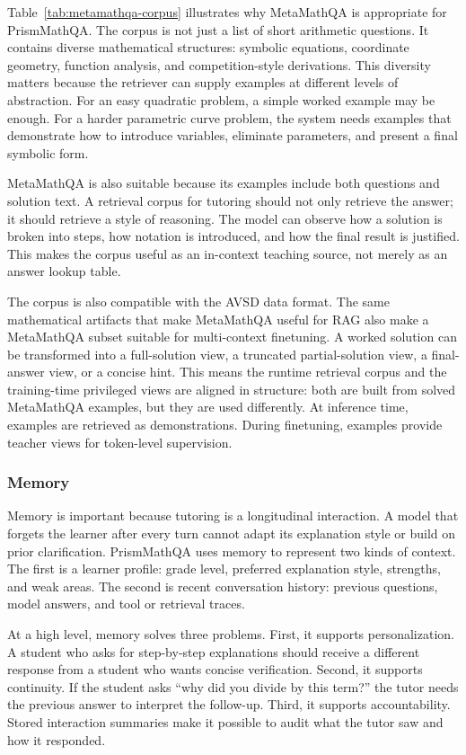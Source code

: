 Table~\ref{tab:metamathqa-corpus} illustrates why MetaMathQA is appropriate for PrismMathQA. The corpus is not just a list of short arithmetic questions. It contains diverse mathematical structures: symbolic equations, coordinate geometry, function analysis, and competition-style derivations. This diversity matters because the retriever can supply examples at different levels of abstraction. For an easy quadratic problem, a simple worked example may be enough. For a harder parametric curve problem, the system needs examples that demonstrate how to introduce variables, eliminate parameters, and present a final symbolic form.

MetaMathQA is also suitable because its examples include both questions and solution text. A retrieval corpus for tutoring should not only retrieve the answer; it should retrieve a style of reasoning. The model can observe how a solution is broken into steps, how notation is introduced, and how the final result is justified. This makes the corpus useful as an in-context teaching source, not merely as an answer lookup table.

The corpus is also compatible with the AVSD data format. The same mathematical artifacts that make MetaMathQA useful for RAG also make a MetaMathQA subset suitable for multi-context finetuning. A worked solution can be transformed into a full-solution view, a truncated partial-solution view, a final-answer view, or a concise hint. This means the runtime retrieval corpus and the training-time privileged views are aligned in structure: both are built from solved MetaMathQA examples, but they are used differently. At inference time, examples are retrieved as demonstrations. During finetuning, examples provide teacher views for token-level supervision.

\subsubsection{Memory}

Memory is important because tutoring is a longitudinal interaction. A model that forgets the learner after every turn cannot adapt its explanation style or build on prior clarification. PrismMathQA uses memory to represent two kinds of context. The first is a learner profile: grade level, preferred explanation style, strengths, and weak areas. The second is recent conversation history: previous questions, model answers, and tool or retrieval traces.

At a high level, memory solves three problems. First, it supports personalization. A student who asks for step-by-step explanations should receive a different response from a student who wants concise verification. Second, it supports continuity. If the student asks ``why did you divide by this term?'' the tutor needs the previous answer to interpret the follow-up. Third, it supports accountability. Stored interaction summaries make it possible to audit what the tutor saw and how it responded.

